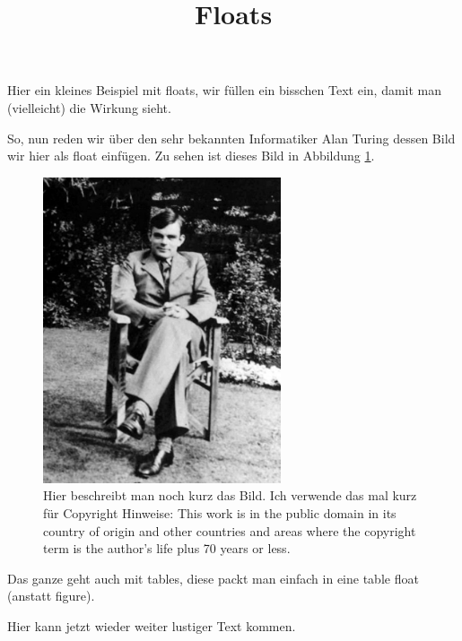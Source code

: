 \documentclass[a4paper]{scrartcl}
\title{Floats}
\author{}
\date{}
\begin{document}
\maketitle

Hier ein kleines Beispiel mit floats, wir füllen ein bisschen Text ein, damit man (vielleicht) die Wirkung sieht.

\lipsum[1-4]

So, nun reden wir über den sehr bekannten Informatiker Alan Turing dessen Bild wir hier als float einfügen.
Zu sehen ist dieses Bild in Abbildung \ref{fig:alan-turing}.

\begin{figure}
    \centering
    \includegraphics[width=7cm]{images/turing}
    \caption{Hier beschreibt man noch kurz das Bild.
    Ich verwende das mal kurz für Copyright Hinweise:
    This work is in the public domain in its country of origin and other countries and areas where the copyright term is the author's life plus 70 years or less.}
    \label{fig:alan-turing}
\end{figure}

Das ganze geht auch mit tables, diese packt man einfach in eine table float (anstatt figure).

Hier kann jetzt wieder weiter lustiger Text kommen.
\end{document}
